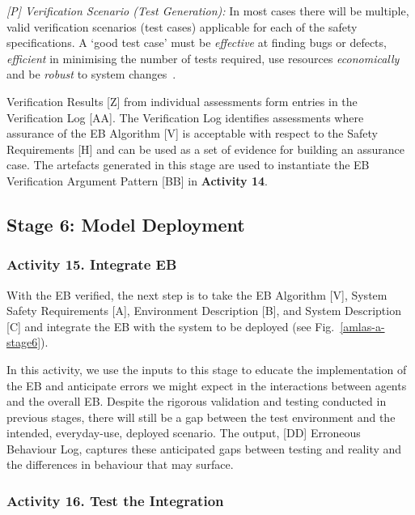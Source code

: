 \documentclass[runningheads]{llncs}
\begin{document}
\emph{[P] Verification Scenario (Test Generation):} In most cases there will be multiple, valid verification scenarios (test cases) applicable for each of the safety specifications. A `good test case' must be \emph{effective} at finding bugs or defects, \emph{efficient} in minimising the number of tests required, use resources \emph{economically} and be \emph{robust} to system changes~\cite{Fewster1999}. 

Verification Results [Z] from individual assessments form entries in the Verification Log [AA]. The Verification Log identifies assessments where assurance of the EB Algorithm [V] is acceptable with respect to the Safety Requirements [H] and can be used as a set of evidence for building an assurance case. %
The artefacts generated in this stage are used to instantiate the EB Verification Argument Pattern [BB] in \textbf{Activity 14}.


\subsection{Stage 6: Model Deployment} \label{framework-stage6}
\subsubsection*{Activity 15. Integrate EB}

With the EB verified, the next step is to take the EB Algorithm [V], System Safety Requirements [A], Environment Description [B], and System Description [C] and integrate the EB with the system to be deployed (see Fig.~\ref{amlas-a-stage6}). 

In this activity, we use the inputs to this stage to educate the implementation of the EB and anticipate errors we might expect in the interactions between agents and the overall EB. Despite the rigorous validation and testing conducted in previous stages, there will still be a gap between the test environment and the intended, everyday-use, deployed scenario. The output, [DD] Erroneous Behaviour Log, captures these anticipated gaps between testing and reality and the differences in behaviour that may surface. 

\subsubsection*{Activity 16. Test the Integration}
\end{document}
